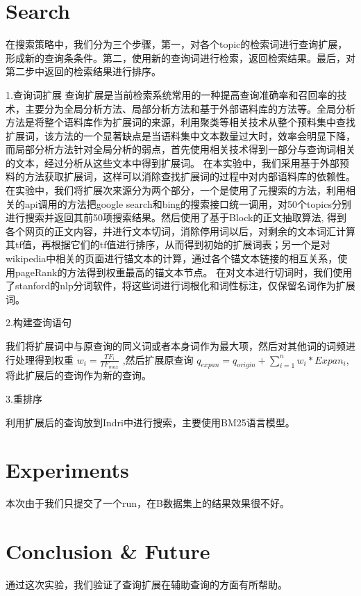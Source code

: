 \documentclass[11pt]{article} %
\begin{document}
\begin{CJK}{UTF8}{gkai}
\section{Search}
在搜索策略中，我们分为三个步骤，第一，对各个topic的检索词进行查询扩展，形成新的查询条条件。第二，使用新的查询词进行检索，返回检索结果。最后，对第二步中返回的检索结果进行排序。

1.查询词扩展
查询扩展是当前检索系统常用的一种提高查询准确率和召回率的技术，主要分为全局分析方法、局部分析方法和基于外部语料库的方法等。全局分析方法是将整个语料库作为扩展词的来源，利用聚类等相关技术从整个预料集中查找扩展词，该方法的一个显著缺点是当语料集中文本数量过大时，效率会明显下降，而局部分析方法针对全局分析的弱点，首先使用相关技术得到一部分与查询词相关的文本，经过分析从这些文本中得到扩展词。
在本实验中，我们采用基于外部预料的方法获取扩展词，这样可以消除查找扩展词的过程中对内部语料库的依赖性。在实验中，我们将扩展次来源分为两个部分，一个是使用了元搜索的方法，利用相关的api调用的方法把google search和bing的搜索接口统一调用，对50个topics分别进行搜索并返回其前50项搜索结果。然后使用了基于Block的正文抽取算法\cite{2012-Lin-p256-264}, 得到各个网页的正文内容，并进行文本切词，消除停用词以后，对剩余的文本词汇计算其tf值，再根据它们的tf值进行排序，从而得到初始的扩展词表；另一个是对wikipedia中相关的页面进行锚文本的计算，通过各个锚文本链接的相互关系，使用pageRank的方法得到权重最高的锚文本节点。
在对文本进行切词时，我们使用了stanford的nlp分词软件，将这些词进行词根化和词性标注，仅保留名词作为扩展词。

2.构建查询语句

我们将扩展词中与原查询的同义词或者本身词作为最大项，然后对其他词的词频进行处理得到权重 $w_i = \frac{TF_i}{TF_{max}}$ ,然后扩展原查询 $q_{expan} = q_{origin} + \sum^n_{i=1}w_i*Expan_i$, 将此扩展后的查询作为新的查询。

3.重排序

利用扩展后的查询放到Indri中进行搜索，主要使用BM25语言模型。


\section{Experiments}

本次由于我们只提交了一个run，在B数据集上的结果效果很不好。

\section{Conclusion & Future}

通过这次实验，我们验证了查询扩展在辅助查询的方面有所帮助。






\end{CJK}
\end{document}
